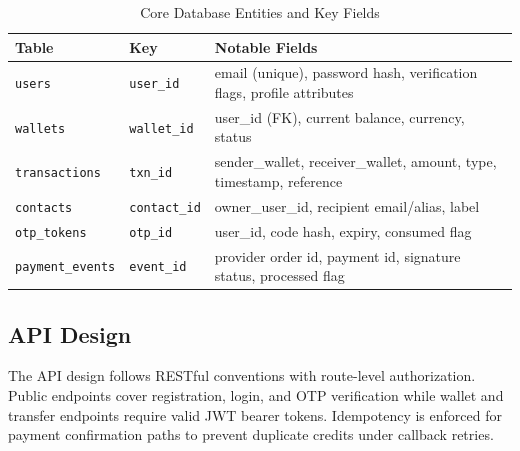 \documentclass[conference]{IEEEtran}
\begin{document}
\begin{table}[t]
\caption{Core Database Entities and Key Fields}
\label{tab:db_schema}
\centering
\small
\begin{tabular}{p{1.7cm}p{1.6cm}p{3.9cm}}
\toprule
\textbf{Table} & \textbf{Key} & \textbf{Notable Fields} \\
\midrule
\texttt{users} & \texttt{user\_id} & email (unique), password hash, verification flags, profile attributes \\
\addlinespace
\texttt{wallets} & \texttt{wallet\_id} & user\_id (FK), current balance, currency, status \\
\addlinespace
\texttt{transactions} & \texttt{txn\_id} & sender\_wallet, receiver\_wallet, amount, type, timestamp, reference \\
\addlinespace
\texttt{contacts} & \texttt{contact\_id} & owner\_user\_id, recipient email/alias, label \\
\addlinespace
\texttt{otp\_tokens} & \texttt{otp\_id} & user\_id, code hash, expiry, consumed flag \\
\addlinespace
\texttt{payment\_events} & \texttt{event\_id} & provider order id, payment id, signature status, processed flag \\
\bottomrule
\end{tabular}
\end{table}

\subsection{API Design}
The API design follows RESTful conventions with route-level authorization. Public endpoints cover registration, login, and OTP verification while wallet and transfer endpoints require valid JWT bearer tokens. Idempotency is enforced for payment confirmation paths to prevent duplicate credits under callback retries.
\end{document}
